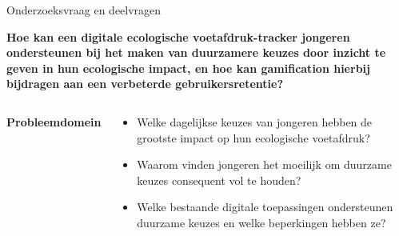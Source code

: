 \documentclass[aspectratio=169]{beamer}
\begin{document}
\begin{frame}[t]{Onderzoeksvraag en deelvragen}
    \vspace{+5pt}
    
    \begin{tcolorbox}[
        colback=colorfive,
        colframe=colorfive,
        coltext=white,
        before skip=0pt,
        after skip=0pt,
        boxrule=0pt,
        arc=2mm]
        \small \textbf{Hoe kan een digitale ecologische voetafdruk-tracker jongeren ondersteunen bij het maken van duurzamere keuzes door inzicht te geven in hun ecologische impact, en hoe kan gamification hierbij bijdragen aan een verbeterde gebruikersretentie?}
    \end{tcolorbox}
    
    \begin{columns}[t,onlytextwidth] %
        \begin{tcolorbox}[columntitle]
            \textbf{Probleemdomein}
        \end{tcolorbox}
        \begin{tcolorbox}[columntext, left=0mm]
            \begin{itemize}[leftmargin=*]
                \item[] \scriptsize Welke dagelijkse keuzes van jongeren hebben de grootste impact op hun ecologische voetafdruk?
                \item[] \scriptsize Waarom vinden jongeren het moeilijk om duurzame keuzes consequent vol te houden?
                \item[] \scriptsize Welke bestaande digitale toepassingen ondersteunen duurzame keuzes en welke beperkingen hebben ze?
            \end{itemize}
        \end{tcolorbox}
        

\end{columns}
\end{frame}
\end{document}
